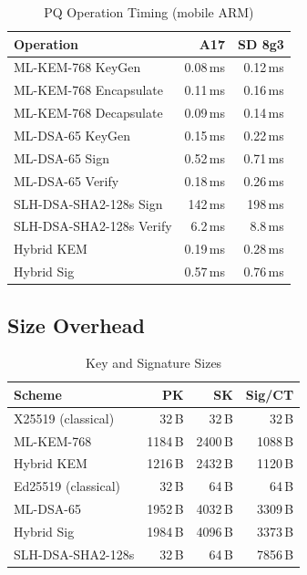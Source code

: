 \documentclass[11pt,a4paper]{article}
\begin{document}
\begin{table}[h]
\centering
\caption{PQ Operation Timing (mobile ARM)}
\label{tab:pq-perf}
\begin{tabular}{@{}lrr@{}}
\toprule
\textbf{Operation} & \textbf{A17} & \textbf{SD 8g3} \\
\midrule
ML-KEM-768 KeyGen       & 0.08\,ms & 0.12\,ms \\
ML-KEM-768 Encapsulate  & 0.11\,ms & 0.16\,ms \\
ML-KEM-768 Decapsulate  & 0.09\,ms & 0.14\,ms \\
ML-DSA-65 KeyGen        & 0.15\,ms & 0.22\,ms \\
ML-DSA-65 Sign          & 0.52\,ms & 0.71\,ms \\
ML-DSA-65 Verify        & 0.18\,ms & 0.26\,ms \\
SLH-DSA-SHA2-128s Sign  & 142\,ms  & 198\,ms  \\
SLH-DSA-SHA2-128s Verify& 6.2\,ms  & 8.8\,ms  \\
\midrule
Hybrid KEM              & 0.19\,ms & 0.28\,ms \\
Hybrid Sig              & 0.57\,ms & 0.76\,ms \\
\bottomrule
\end{tabular}
\end{table}

\subsection{Size Overhead}

\begin{table}[h]
\centering
\caption{Key and Signature Sizes}
\label{tab:sizes}
\begin{tabular}{@{}lrrr@{}}
\toprule
\textbf{Scheme} & \textbf{PK} & \textbf{SK} & \textbf{Sig/CT} \\
\midrule
X25519 (classical)  & 32\,B   & 32\,B   & 32\,B \\
ML-KEM-768          & 1184\,B & 2400\,B & 1088\,B \\
Hybrid KEM          & 1216\,B & 2432\,B & 1120\,B \\
\midrule
Ed25519 (classical) & 32\,B   & 64\,B   & 64\,B \\
ML-DSA-65           & 1952\,B & 4032\,B & 3309\,B \\
Hybrid Sig          & 1984\,B & 4096\,B & 3373\,B \\
\midrule
SLH-DSA-SHA2-128s   & 32\,B   & 64\,B   & 7856\,B \\
\bottomrule
\end{tabular}
\end{table}
\end{document}
